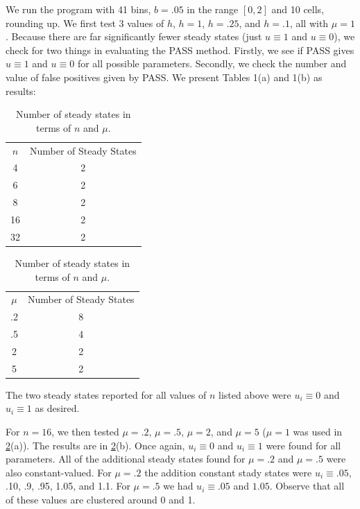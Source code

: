 \documentclass[11pt]{article}
\newcommand{\bhline}{\Xhline{2\arrayrulewidth}}
\begin{document}
We run the program with 41 bins, $b = .05$ in the range $[0,2]$ and 10 cells, rounding up. We first test 3 values of $h$, $h = 1$, $h = .25$, and $h = .1$, all with $\mu = 1$. Because there are far significantly fewer steady states (just $u \equiv 1$ and $u \equiv 0$), we check for two things in evaluating the PASS method. Firstly, we see if PASS gives $u \equiv 1$ and $u \equiv 0$ for all possible parameters. Secondly, we check the number and value of false positives given by PASS. We present Tables 1(a) and 1(b) as results:

\begin{table}
\begin{center}

\begin{tabular}{ | c | c | }
\hline
$n$ & Number of Steady States \\
\bhline
4 & 2 \\
\hline
6 & 2 \\
\hline
8 & 2 \\ 
\hline
16 & 2 \\
\hline
32 & 2 \\
\hline
\end{tabular}
\hspace{.5in}
\begin{tabular}{ | c | c | }
\hline
$\mu$ & Number of Steady States \\
\bhline
.2 & 8 \\
\hline
.5 & 4 \\ 
\hline
2 & 2 \\
\hline
5 & 2 \\
\hline
\end{tabular}

\caption{Number of steady states in terms of $n$ and $\mu$.}
\label{Fisher Statistics}
\end{center}
\end{table}

The two steady states reported for all values of $n$ listed above were $u_i \equiv 0$ and $u_i \equiv 1$ as desired.

For $n = 16$, we then tested $\mu = .2$, $\mu = .5$, $\mu = 2$, and $\mu = 5$ ($\mu = 1$ was used in \cref{Fisher Statistics}(a)). The results are in \cref{Fisher Statistics}(b). Once again, $u_i \equiv 0$ and $u_i \equiv 1$ were found for all parameters. All of the additional steady states found for $\mu = .2$ and $\mu = .5$ were also constant-valued. For $\mu = .2$ the addition constant stady states were $u_i \equiv .05$, .10, .9, .95, 1.05, and 1.1. For $\mu = .5$ we had $u_i \equiv .05$ and $1.05$. Observe that all of these values are clustered around 0 and 1.
\end{document}
